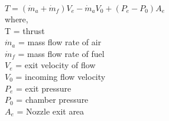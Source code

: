 
$T = (\dot m_a + \dot m_f) V_e - \dot m_a V_0 + (P_e - P_0)A_e$\\

where,\\
T = thrust\\
$\dot m_a$ = mass flow rate of air\\
$\dot m_f$ = mass flow rate of fuel\\
$V_e$ = exit velocity of flow\\
$V_0$ = incoming flow velocity\\
$P_e$ = exit pressure \\
$P_0$ = chamber pressure\\
$A_e$ = Nozzle exit area
